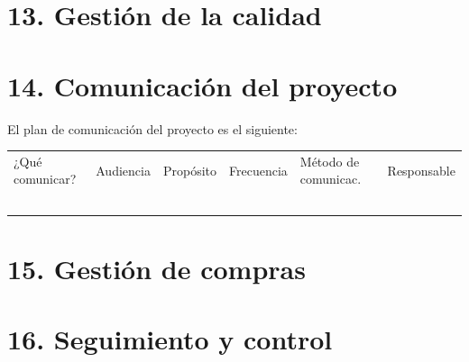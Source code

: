\documentclass[11pt]{charter}
\begin{document}
\section{13. Gestión de la calidad}
\label{sec:calidad}

\section{14. Comunicación del proyecto}
\label{sec:comunicaciones}

El plan de comunicación del proyecto es el siguiente:

\begin{table}[htpb]
\centering
\begin{tabularx}{\linewidth}{@{}|X|C{2.4cm}|C{3cm}|C{1.8cm}|C{2cm}|C{2.1cm}|@{}}
\hline
{} 
           \\ \hline
{} 
¿Qué comunicar? & Audiencia & Propósito & Frecuencia & Método de comunicac. & Responsable \\ \hline
                &           &           &            &                      &             \\ \hline
                &           &           &            &                      &             \\ \hline
                &           &           &            &                      &             \\ \hline
                &           &           &            &                      &             \\ \hline
                &           &           &            &                      &             \\ \hline
\end{tabularx}
\end{table}

\section{15. Gestión de compras}
\label{sec:compras}

\section{16. Seguimiento y control}
\label{sec:seguimiento}
\end{document}
